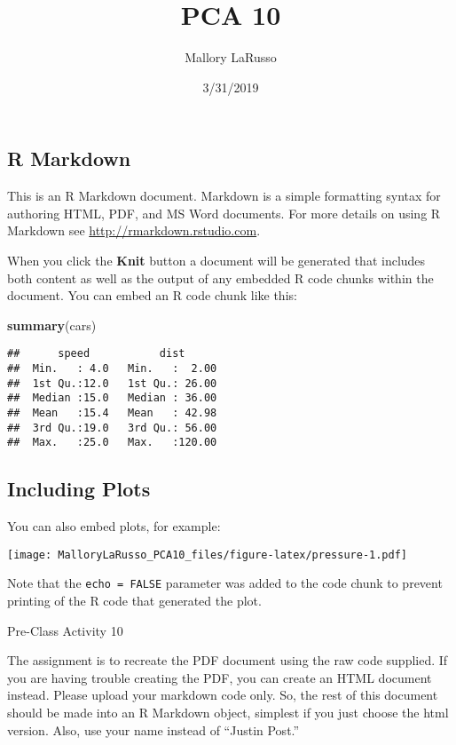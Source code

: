 \documentclass[]{article}
\title{PCA 10}
\author{Mallory LaRusso}
\date{3/31/2019}
\newenvironment{Shaded}{\begin{snugshade}}{\end{snugshade}}
\newcommand{\KeywordTok}[1]{\textcolor[rgb]{0.13,0.29,0.53}{\textbf{#1}}}
\newcommand{\NormalTok}[1]{#1}
\begin{document}
\maketitle

\subsection{R Markdown}\label{r-markdown}

This is an R Markdown document. Markdown is a simple formatting syntax
for authoring HTML, PDF, and MS Word documents. For more details on
using R Markdown see \url{http://rmarkdown.rstudio.com}.

When you click the \textbf{Knit} button a document will be generated
that includes both content as well as the output of any embedded R code
chunks within the document. You can embed an R code chunk like this:

\begin{Shaded}
\begin{Highlighting}[]
\KeywordTok{summary}\NormalTok{(cars)}
\end{Highlighting}
\end{Shaded}

\begin{verbatim}
##      speed           dist       
##  Min.   : 4.0   Min.   :  2.00  
##  1st Qu.:12.0   1st Qu.: 26.00  
##  Median :15.0   Median : 36.00  
##  Mean   :15.4   Mean   : 42.98  
##  3rd Qu.:19.0   3rd Qu.: 56.00  
##  Max.   :25.0   Max.   :120.00
\end{verbatim}

\subsection{Including Plots}\label{including-plots}

You can also embed plots, for example:

\texttt{[image: MalloryLaRusso\_PCA10\_files/figure-latex/pressure-1.pdf]}

Note that the \texttt{echo\ =\ FALSE} parameter was added to the code
chunk to prevent printing of the R code that generated the plot.

Pre-Class Activity 10

The assignment is to recreate the PDF document using the raw code
supplied. If you are having trouble creating the PDF, you can create an
HTML document instead. Please upload your markdown code only. So, the
rest of this document should be made into an R Markdown object, simplest
if you just choose the html version. Also, use your name instead of
``Justin Post.''
\end{document}
